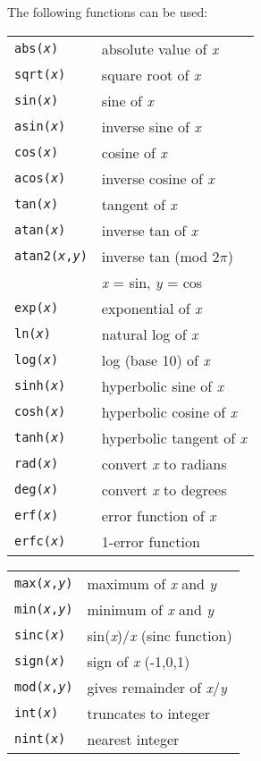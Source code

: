 The following functions can be used:

{\small
\begin{tabular}{ll}
{\tt abs({\it x})}&absolute value of {\it x}\\
{\tt sqrt({\it x})}&square root of {\it x}  \\
{\tt sin({\it x})}&sine of {\it x}\\
{\tt asin({\it x})}&inverse sine of {\it x}\\
{\tt cos({\it x})}&cosine of {\it x}\\
{\tt acos({\it x})}&inverse cosine of {\it x}\\
{\tt tan({\it x})}&tangent of {\it x}\\
{\tt atan({\it x})}&inverse tan of {\it x}\\
{\tt atan2({\it x},{\it y})}&inverse tan (mod 2$\pi$)\\
 &{\it x} = sin, {\it y} = cos\\
{\tt exp({\it x})}&exponential of {\it x}\\
{\tt ln({\it x})}&natural log of {\it x}\\
{\tt log({\it x})}&log (base 10) of {\it x}\\
{\tt sinh({\it x})}&hyperbolic sine of {\it x}\\
{\tt cosh({\it x})}&hyperbolic cosine of {\it x}\\  
{\tt tanh({\it x})}&hyperbolic tangent of {\it x}\\
{\tt rad({\it x})}&convert {\it x} to radians\\
{\tt deg({\it x})}&convert {\it x} to degrees\\
{\tt erf({\it x})}&error function of {\it x}\\  
{\tt erfc({\it x})}&1-error function\\
\end{tabular}
\begin{tabular}{ll}
{\tt max({\it x},{\it y})}&maximum of {\it x} and {\it y}\\
{\tt min({\it x},{\it y})}&minimum of {\it x} and {\it y}\\
{\tt sinc({\it x})}&sin({\it x})/{\it x} (sinc function)\\
{\tt sign({\it x})}&sign of {\it x} (-1,0,1)\\
{\tt mod({\it x},{\it y})}&gives remainder of {\it x}/{\it y}\\
{\tt int({\it x})}&truncates to integer\\
{\tt nint({\it x})}&nearest integer\\

\end{tabular}}

